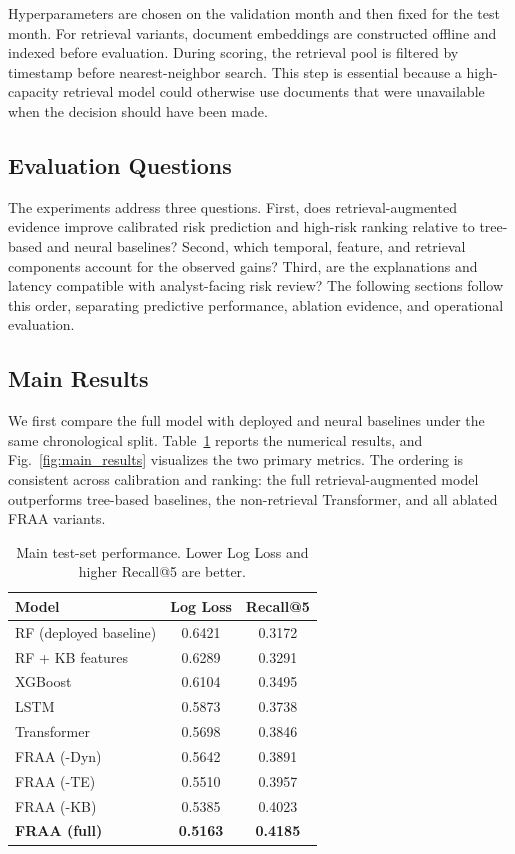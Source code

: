 \documentclass[runningheads]{llncs}
\newcommand{\best}[1]{\textbf{#1}}
\begin{document}
Hyperparameters are chosen on the validation month and then fixed for the test month. For retrieval variants, document embeddings are constructed offline and indexed before evaluation. During scoring, the retrieval pool is filtered by timestamp before nearest-neighbor search. This step is essential because a high-capacity retrieval model could otherwise use documents that were unavailable when the decision should have been made.

\subsection{Evaluation Questions}
The experiments address three questions. First, does retrieval-augmented evidence improve calibrated risk prediction and high-risk ranking relative to tree-based and neural baselines? Second, which temporal, feature, and retrieval components account for the observed gains? Third, are the explanations and latency compatible with analyst-facing risk review? The following sections follow this order, separating predictive performance, ablation evidence, and operational evaluation.

\subsection{Main Results}

We first compare the full model with deployed and neural baselines under the same chronological split. Table~\ref{tab:main_results} reports the numerical results, and Fig.~\ref{fig:main_results} visualizes the two primary metrics. The ordering is consistent across calibration and ranking: the full retrieval-augmented model outperforms tree-based baselines, the non-retrieval Transformer, and all ablated FRAA variants.

\begin{table}[H]
\centering
\caption{Main test-set performance. Lower Log Loss and higher Recall@5 are better.}
\label{tab:main_results}
\begin{tabular}{lcc}
\toprule
\textbf{Model} & \textbf{Log Loss} & \textbf{Recall@5} \\
\midrule
RF (deployed baseline) & 0.6421 & 0.3172 \\
\rowcolor{tablerowalt}
RF + KB features & 0.6289 & 0.3291 \\
XGBoost & 0.6104 & 0.3495 \\
\rowcolor{tablerowalt}
LSTM & 0.5873 & 0.3738 \\
Transformer & 0.5698 & 0.3846 \\
\rowcolor{tablerowalt}
FRAA (-Dyn) & 0.5642 & 0.3891 \\
FRAA (-TE) & 0.5510 & 0.3957 \\
\rowcolor{tablerowalt}
FRAA (-KB) & 0.5385 & 0.4023 \\
\textbf{FRAA (full)} & \best{0.5163} & \best{0.4185} \\
\bottomrule
\end{tabular}
\end{table}
\end{document}
